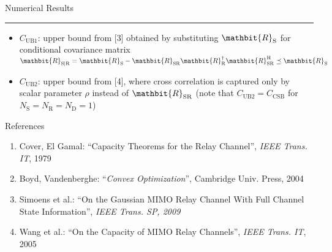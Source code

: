 \documentclass[a0,landscape,3col,print]{msvposter}
\newcommand{\Nd}{N_{\mathrm{D}}}
\newcommand{\Ns}{N_{\mathrm{S}}}
\newcommand{\Nr}{N_{\mathrm{R}}}
\newcommand{\Rs}{\mathbit{R}_{\mathrm{S}}}
\newcommand{\Rr}{\mathbit{R}_{\mathrm{R}}}
\newcommand{\Rsr}{\mathbit{R}_{\mathrm{SR}}}
\newcommand{\Rsgr}{\mathbit{R}_{\mathrm{S}|\mathrm{R}}}
\newcommand{\he}{\operatorname{H}}
\newcommand{\nsd}{\preceq}
\newcommand{\CSB}{C_{\text{CSB}}}
\newcommand{\marked}[1]{#1}
\begin{document}
\begin{poster}
\begin{postercolumn}
\begin{posterbox}{Numerical Results}
    \hrule
    \vspace{8mm}

    \begin{itemize}\itemsep7mm
        \item $C_{\text{UB}1}$: upper bound from \marked{[3]} obtained by substituting $\Rs$ for conditional covariance matrix $\Rsgr = \Rs - \Rsr \Rr^{\dagger} \Rsr^{\he} \nsd \Rs$
        \item $C_{\text{UB}2}$: upper bound from \marked{[4]}, where cross correlation is captured only by scalar parameter $\rho$ instead of $\Rsr$ (note that $C_{\text{UB}2} = \CSB$ for $\Ns = \Nr = \Nd = 1$)
    \end{itemize}
\end{posterbox}


\begin{posterbox}{References}
    \begin{enumerate}\itemsep0mm
        \item Cover, El Gamal: ``Capacity Theorems for the Relay Channel'', \textit{IEEE Trans. IT}, 1979
        \item Boyd, Vandenberghe: ``\textit{Convex Optimization}'', Cambridge Univ. Press, 2004
        \item Simoens et al.: ``On the Gaussian MIMO Relay Channel With Full Channel State Information'', \textit{IEEE Trans. SP, 2009}
        \item Wang et al.: ``On the Capacity of MIMO Relay Channels'', \textit{IEEE Trans. IT}, 2005
    \end{enumerate}
\end{posterbox}

\end{postercolumn}

\end{poster}
    
\end{document}
